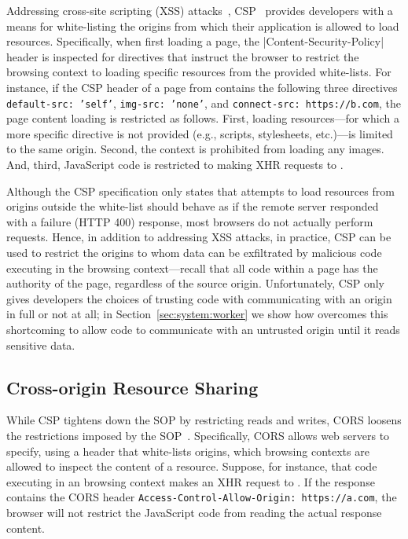 Addressing cross-site scripting (XSS) attacks~,
CSP~ provides developers with a means for
white-listing the origins from which their application is allowed to
load resources.
%
Specifically, when first loading a page, the
\js|Content-Security-Policy| header is inspected for directives that
instruct the browser to restrict the browsing context to loading
specific resources from the provided white-lists.
%
For instance, if the CSP header of a page from  contains
the following three directives
%
\texttt{default-src: 'self'}, \texttt{img-src: 'none'}, and
\texttt{connect-src: https://b.com},
%
the page content loading is restricted as follows.
%
First, loading resources---for which a more specific directive is not
provided (e.g., scripts, stylesheets, etc.)---is limited to the same
origin.
%
Second, the context is prohibited from loading any images.
%
And, third, JavaScript code is restricted to making XHR requests to
.

Although the CSP specification only states that attempts to load
resources from origins outside the white-list should behave as if the
remote server responded with a failure (HTTP 400) response, most
browsers do not actually perform requests.
%
Hence, in addition to addressing XSS attacks, in practice, CSP can
be used to restrict the origins to whom data can be exfiltrated by
malicious code executing in the browsing context---recall that all code
within a page has the authority of the page, regardless of the source
origin.
%
Unfortunately, CSP only gives developers the choices of trusting code
with communicating with an origin in full or not at all;
%
in Section~\ref{sec:system:worker} we show how \sys{} overcomes this
shortcoming to allow code to communicate with an untrusted origin
until it reads sensitive data.


\subsection{Cross-origin Resource Sharing} 
\label{sec:background:cors}

While CSP tightens down the SOP by restricting reads and writes, CORS
loosens the restrictions imposed by the SOP~\cite{VanKesteren2012}.
%
Specifically, CORS allows web servers to specify, using a header that
white-lists origins, which browsing contexts are allowed to inspect
the content of a resource.
%
Suppose, for instance, that code executing in an  browsing
context makes an XHR request to .
%
If the response contains the CORS header
\texttt{Access-Control-Allow-Origin: https://a.com}, the browser will
not restrict the JavaScript code from reading the actual response
content.

